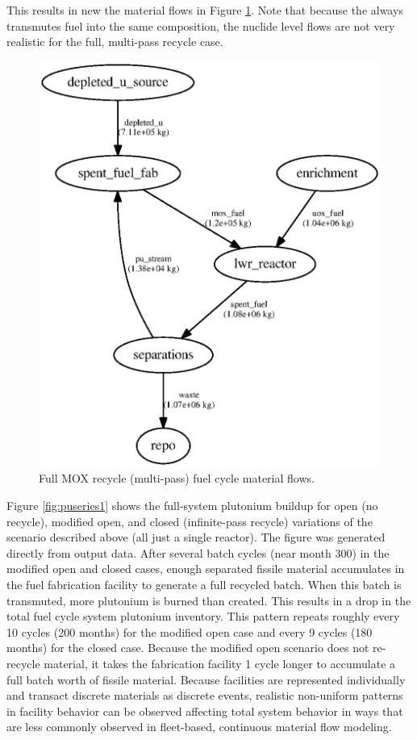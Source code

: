 This results in new the material flows in Figure \ref{fig:flowclosed}. Note
that because the  always transmutes fuel into the same
composition, the nuclide level flows are not very realistic for the full, 
multi-pass
recycle case.

\begin{figure}[H]
\label{fig:flowclosed}
\caption{Full \gls{MOX} recycle (multi-pass) fuel cycle material flows.}
\begin{center}
\includegraphics{./images/flow-closed-1.eps}
\end{center}
\end{figure}

Figure \ref{fig:puseries1} shows the full-system plutonium buildup for open
(no recycle), modified open, and closed (infinite-pass recycle) variations of
the scenario described above (all just a single reactor).  The figure was
generated directly from \Cyclus output data. After several batch cycles (near
month 300) in the modified open and closed cases, enough separated fissile
material accumulates in the fuel fabrication facility to generate a full
recycled batch.  When this batch is transmuted, more plutonium is burned than
created.  This results in a drop in the total fuel cycle system plutonium
inventory.  This pattern repeats roughly every 10 cycles (200 months) for the
modified open case and every 9 cycles (180 months) for the closed case.
Because the modified open scenario does not re-recycle material, it takes the
fabrication facility 1 cycle longer to accumulate a full batch worth of
fissile material.  Because facilities are represented individually and
transact discrete materials as discrete events, realistic non-uniform patterns
in facility behavior can be observed affecting total system behavior in ways
that are less commonly observed in fleet-based, continuous material flow
modeling.

